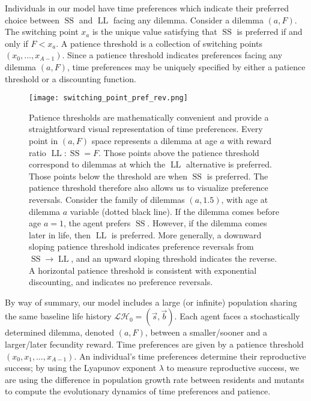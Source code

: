 \documentclass[titlepage, hidelinks, 12pt]{article}
\theoremstyle{plain}
\theoremstyle{remark}
\theoremstyle{definition}
\newcommand{\LH}{\mathcal{LH}}
\DeclareMathOperator{\smallersooner}{SS}
\DeclareMathOperator{\largerlater}{LL}
\begin{document}
Individuals in our model have time preferences which indicate their preferred choice between $\smallersooner$ and $\largerlater$ facing any
dilemma. 
Consider a dilemma $(a, F)$. The switching point $x_a$ is the unique value satisfying that $\smallersooner$ is preferred
if and only if $F < x_a$. 
A patience threshold is a collection of switching points $(x_0, \ldots, x_{A-1})$.
Since a patience threshold indicates preferences facing any dilemma $(a, F)$, time preferences may be uniquely 
specified by either a patience threshold or a discounting function. 

\begin{figure}[H]
    \centering
    \texttt{[image: switching\_point\_pref\_rev.png]}
    \caption[Patience threshold and alternative perspective on preference reversals.]{Patience thresholds are mathematically convenient and provide a straightforward visual representation of time preferences. 
        Every point in $(a, F)$ space
    represents a dilemma at age $a$ with reward ratio $\largerlater : \smallersooner = F$. 
    Those points above the patience threshold correspond to dilemmas at which the $\largerlater$ alternative
is preferred. Those points below the threshold are when $\smallersooner$ is preferred. The patience threshold therefore also allows
us to visualize preference reversals. Consider the family of dilemmas $(a, 1.5)$, with age at dilemma $a$ variable (dotted black line). If the dilemma comes 
before age $a = 1$, the agent 
prefers $\smallersooner$. However, if the dilemma comes later in life, then $\largerlater$ is preferred. More generally, a
downward sloping patience threshold indicates preference reversals from $\smallersooner\to\largerlater$, and an upward sloping threshold
indicates the reverse. A horizontal patience threshold is consistent with exponential discounting, and indicates no preference reversals.
}
\end{figure}

By way of summary, our model includes a large (or infinite) population sharing the same baseline life history $\LH_0 = (\vec{s}, \vec{b}).$ 
Each agent faces a stochastically determined dilemma, denoted $(a, F)$, between a smaller/sooner and a larger/later fecundity reward. 
Time preferences are given by a patience threshold $(x_0, x_1, \ldots, x_{A-1})$. 
An individual's time preferences determine their reproductive success; by using the Lyapunov exponent $\lambda$ to measure reproductive 
success, we are using the difference in population growth rate between residents and mutants to compute the evolutionary dynamics of time
preferences and patience. 
\end{document}

